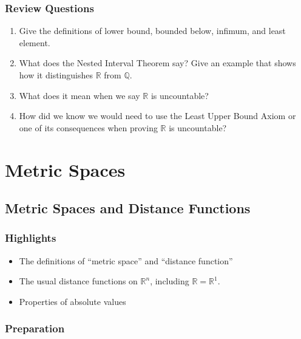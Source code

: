 \documentclass[
  letterpaper,
  DIV=11,
  numbers=noendperiod]{scrreprt}
\providecommand{\tightlist}{%
  \setlength{\itemsep}{0pt}\setlength{\parskip}{0pt}}
\def\R{\mathbb R}
\def\Q{\mathbb Q}
\theoremstyle{plain}
\theoremstyle{definition}
\theoremstyle{plain}
\theoremstyle{plain}
\theoremstyle{definition}
\theoremstyle{definition}
\theoremstyle{remark}
\begin{document}
\section*{Review Questions}\label{review-questions-2}


\begin{enumerate}
\def\labelenumi{\arabic{enumi}.}
\tightlist
\item
  Give the definitions of lower bound, bounded below, infimum, and least
  element.
\item
  What does the Nested Interval Theorem say? Give an example that shows
  how it distinguishes \(\R\) from \(\Q\).
\item
  What does it mean when we say \(\R\) is uncountable?
\item
  How did we know we would need to use the Least Upper Bound Axiom or
  one of its consequences when proving \(\R\) is uncountable?
\end{enumerate}

\part{Metric Spaces}

\chapter{Metric Spaces and Distance
Functions}\label{metric-spaces-and-distance-functions}

\section*{Highlights}\label{highlights-3}


\begin{itemize}
\tightlist
\item
  The definitions of ``metric space'' and ``distance function''
\item
  The usual distance functions on \(\R^n\), including \(\R=\R^1\).
\item
  Properties of absolute values
\end{itemize}

\section{Preparation}\label{preparation-3}
\end{document}
